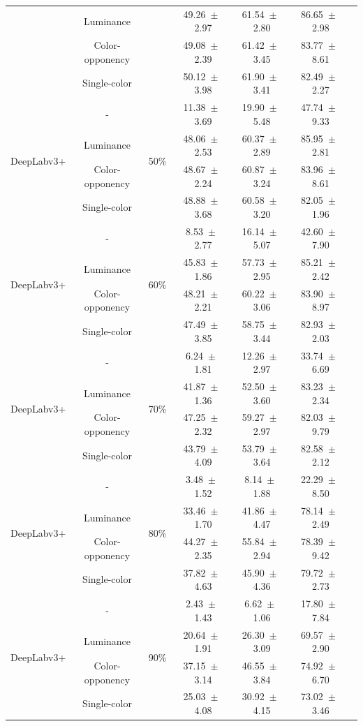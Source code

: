 \begin{table}[h]
\begin{tabular}{@{}lccc ccc@{}}
& Luminance & & 49.26~$\pm$~2.97 & 61.54~$\pm$~2.80 & 86.65~$\pm$~2.98 \\
& Color-opponency & & 49.08~$\pm$~2.39 & 61.42~$\pm$~3.45 & 83.77~$\pm$~8.61 \\
& Single-color & & 50.12~$\pm$~3.98 & 61.90~$\pm$~3.41 & 82.49~$\pm$~2.27 \\
\midrule
\multirow{4}{*}{DeepLabv3+} & - & \multirow{4}{*}{50\%} & 11.38~$\pm$~3.69 & 19.90~$\pm$~5.48 & 47.74~$\pm$~9.33 \\
& Luminance & & 48.06~$\pm$~2.53 & 60.37~$\pm$~2.89 & 85.95~$\pm$~2.81 \\
& Color-opponency & & 48.67~$\pm$~2.24 & 60.87~$\pm$~3.24 & 83.96~$\pm$~8.61 \\
& Single-color & & 48.88~$\pm$~3.68 & 60.58~$\pm$~3.20 & 82.05~$\pm$~1.96 \\
\midrule
\multirow{4}{*}{DeepLabv3+} & - & \multirow{4}{*}{60\%} & 8.53~$\pm$~2.77 & 16.14~$\pm$~5.07 & 42.60~$\pm$~7.90 \\
& Luminance & & 45.83~$\pm$~1.86 & 57.73~$\pm$~2.95 & 85.21~$\pm$~2.42 \\
& Color-opponency & & 48.21~$\pm$~2.21 & 60.22~$\pm$~3.06 & 83.90~$\pm$~8.97 \\
& Single-color & & 47.49~$\pm$~3.85 & 58.75~$\pm$~3.44 & 82.93~$\pm$~2.03 \\
\midrule
\multirow{4}{*}{DeepLabv3+} & - & \multirow{4}{*}{70\%} & 6.24~$\pm$~1.81 & 12.26~$\pm$~2.97 & 33.74~$\pm$~6.69 \\
& Luminance & & 41.87~$\pm$~1.36 & 52.50~$\pm$~3.60 & 83.23~$\pm$~2.34 \\
& Color-opponency & & 47.25~$\pm$~2.32 & 59.27~$\pm$~2.97 & 82.03~$\pm$~9.79 \\
& Single-color & & 43.79~$\pm$~4.09 & 53.79~$\pm$~3.64 & 82.58~$\pm$~2.12 \\
\midrule
\multirow{4}{*}{DeepLabv3+} & - & \multirow{4}{*}{80\%} & 3.48~$\pm$~1.52 & 8.14~$\pm$~1.88 & 22.29~$\pm$~8.50 \\
& Luminance & & 33.46~$\pm$~1.70 & 41.86~$\pm$~4.47 & 78.14~$\pm$~2.49 \\
& Color-opponency & & 44.27~$\pm$~2.35 & 55.84~$\pm$~2.94 & 78.39~$\pm$~9.42 \\
& Single-color & & 37.82~$\pm$~4.63 & 45.90~$\pm$~4.36 & 79.72~$\pm$~2.73 \\
\midrule
\multirow{4}{*}{DeepLabv3+} & - & \multirow{4}{*}{90\%} & 2.43~$\pm$~1.43 & 6.62~$\pm$~1.06 & 17.80~$\pm$~7.84 \\
& Luminance & & 20.64~$\pm$~1.91 & 26.30~$\pm$~3.09 & 69.57~$\pm$~2.90 \\
& Color-opponency & & 37.15~$\pm$~3.14 & 46.55~$\pm$~3.84 & 74.92~$\pm$~6.70 \\
& Single-color & & 25.03~$\pm$~4.08 & 30.92~$\pm$~4.15 & 73.02~$\pm$~3.46 \\
\midrule
\bottomrule
\end{tabular}
\label{tab:sparse_results_deeplabv3plus_acdc_fog}
\end{table}